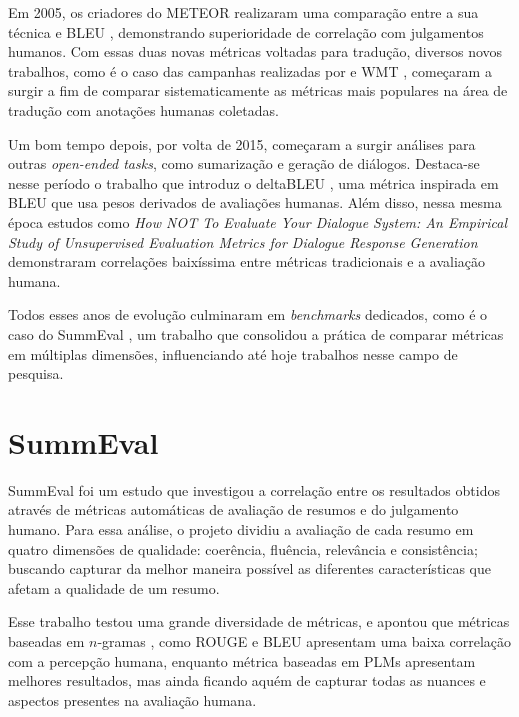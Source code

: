 \documentclass[cic,tc]{iiufrgs}
\begin{document}
Em 2005, os criadores do METEOR \cite{banerjee2005meteor} realizaram uma comparação entre a sua técnica e BLEU \cite{papineni2002bleu}, demonstrando superioridade de correlação com julgamentos humanos. Com essas duas novas métricas voltadas para tradução, diversos novos trabalhos, como é o caso das campanhas realizadas por \citet{nist2006nist} e WMT \cite{koehn2006manual}, começaram a surgir a fim de comparar sistematicamente as métricas mais populares na área de tradução com anotações humanas coletadas.

Um bom tempo depois, por volta de 2015, começaram a surgir análises para outras \textit{open-ended tasks}, como sumarização e geração de diálogos. Destaca-se nesse período o trabalho que introduz o deltaBLEU \cite{galley2015deltableu}, uma métrica inspirada em BLEU \cite{papineni2002bleu} que usa pesos derivados de avaliações humanas. Além disso, nessa mesma época estudos como \textit{How NOT To Evaluate Your Dialogue System: An Empirical Study of Unsupervised Evaluation Metrics for Dialogue Response Generation} \cite{liu2016how} demonstraram correlações baixíssima entre métricas tradicionais e a avaliação humana. 

Todos esses anos de evolução culminaram em \textit{benchmarks} dedicados, como é o caso do SummEval \cite{fabbri2021summeval}, um trabalho que consolidou a prática de comparar métricas em múltiplas dimensões, influenciando até hoje trabalhos nesse campo de pesquisa.

\section{SummEval}
\label{sec:summeval}
SummEval \cite{fabbri2021summeval} foi um estudo que investigou a correlação entre os resultados obtidos através de métricas automáticas de avaliação de resumos e do julgamento humano. Para essa análise, o projeto dividiu a avaliação de cada resumo em quatro dimensões de qualidade: coerência, fluência, relevância e consistência; buscando capturar da melhor maneira possível as diferentes características que afetam a qualidade de um resumo.

Esse trabalho testou uma grande diversidade de métricas, e apontou que métricas baseadas em $n$-gramas \cite{shannon1948mathematical}, como ROUGE \cite{lin2004rouge} e BLEU \cite{papineni2002bleu} apresentam uma baixa correlação com a percepção humana, enquanto métrica baseadas em PLMs apresentam melhores resultados, mas ainda ficando aquém de capturar todas as nuances e aspectos presentes na avaliação humana.
\end{document}
